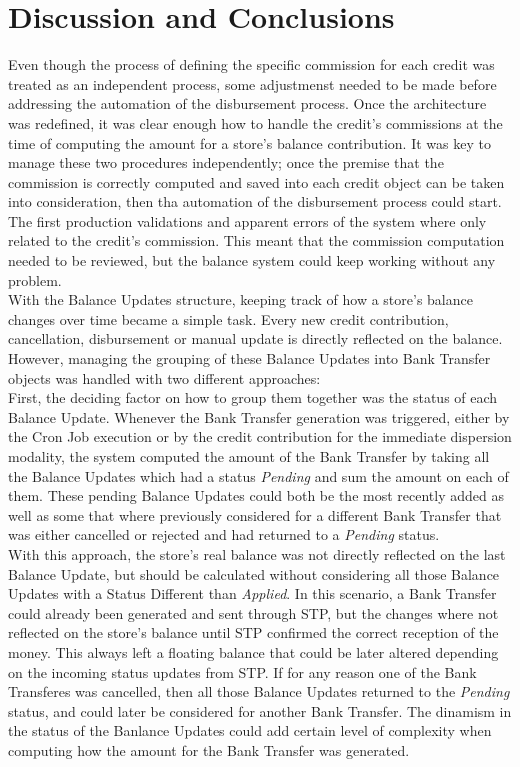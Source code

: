 
\chapter{Discussion and Conclusions}

Even though the process of defining the specific commission for each credit was treated as an independent process, some adjustmenst needed to be made before addressing the automation of the disbursement process. Once the architecture was redefined, it was clear enough how to handle the credit's commissions at the time of computing the amount for a store's balance contribution. It was key to manage these two procedures independently; once the premise that the commission is correctly computed and saved into each credit object can be taken into consideration, then tha automation of the disbursement process could start. The first production validations and apparent errors of the system where only related to the credit's commission. This meant that the commission computation needed to be reviewed, but the balance system could keep working without any problem.\\

With the Balance Updates structure, keeping track of how a store's balance changes over time became a simple task. Every new credit contribution, cancellation, disbursement or manual update is directly reflected on the balance. However, managing the grouping of these Balance Updates into Bank Transfer objects was handled with two different approaches:\\

First, the deciding factor on how to group them together was the status of each Balance Update. Whenever the Bank Transfer generation was triggered, either by the Cron Job execution or by the credit contribution for the immediate dispersion modality, the system computed the amount of the Bank Transfer by taking all the Balance Updates which had a status \textit{Pending} and sum the amount on each of them. These pending Balance Updates could both be the most recently added as well as some that where previously considered for a different Bank Transfer that was either cancelled or rejected and had returned to a \textit{Pending }status.\\ 

With this approach, the store's real balance was not directly reflected on the last Balance Update, but should be calculated without considering all those Balance Updates with a Status Different than \textit{Applied}. In this scenario, a Bank Transfer could already been generated and sent through STP, but the changes where not reflected on the store's balance until STP confirmed the correct reception of the money. This always left a floating balance that could be later altered depending on the incoming status updates from STP. If for any reason one of the Bank Transferes was cancelled, then all those Balance Updates returned to the \textit{Pending} status, and could later be considered for another Bank Transfer. The dinamism in the status of the Banlance Updates could add certain level of complexity when computing how the amount for the Bank Transfer was generated.\\ 



